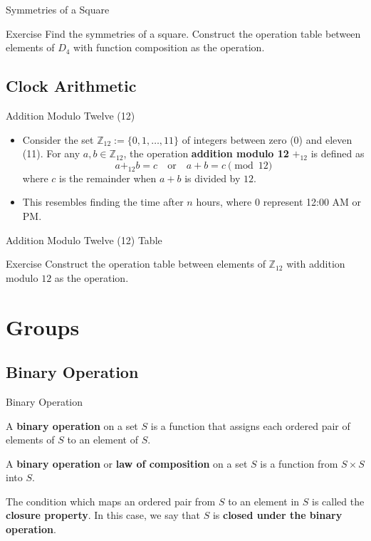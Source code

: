 \documentclass{beamer}
\begin{document}
\begin{frame}{Symmetries of a Square}
\justifying
\begin{block}{Exercise}
\justifying
Find the symmetries of a square. Construct the operation table between elements of $D_4$ with function composition as the operation.
\end{block}
\end{frame}

\subsection{Clock Arithmetic}

\begin{frame}{Addition Modulo Twelve (12)}
\begin{itemize}
\justifying
\item Consider the set $\mathbb{Z}_{12} := \{0, 1, \dots, 11\}$ of integers between zero (0) and eleven (11). For any $a, b \in \mathbb{Z}_{12}$, the operation \textbf{addition modulo 12} $+_{12}$ is defined as
\[
a +_{12} b = c \quad\text{or}\quad a + b = c \pmod{12}
\]
where $c$ is the remainder when $a + b$ is divided by $12$.
\item This resembles finding the time after $n$ hours, where $0$ represent 12:00 AM or PM.
\end{itemize}
\end{frame}

\begin{frame}{Addition Modulo Twelve (12) Table}
\begin{block}{Exercise}
\justifying
Construct the operation table between elements of $\mathbb{Z}_{12}$ with addition modulo $12$ as the operation.
\end{block}
\end{frame}

\section*{Groups}

\subsection{Binary Operation}

\begin{frame}{Binary Operation}
\justifying
\begin{definition}
\justifying
A \textbf{binary operation} on a set $S$ is a function that assigns each ordered pair of elements of $S$ to an element of $S$.     
\end{definition}
\pause
\begin{definition}[Restated]
\justifying
A \textbf{binary operation} or \textbf{law of composition} on a set $S$ is a function from $S \times S$ into $S$.     
\end{definition}
\pause
The condition which maps an ordered pair from $S$ to an element in $S$ is called the \textbf{closure property}. In this case, we say that $S$ is \textbf{closed under the binary operation}.
\end{frame}
\end{document}
